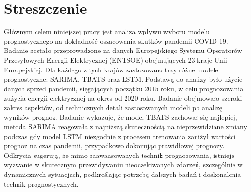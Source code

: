 \documentclass[polish, twoside, 12pt, a4paper]{article}
\theoremstyle{definition}
\theoremstyle{plain}
\theoremstyle{remark}
\begin{document}
\clearpage
%
%

\printbibliography[heading=subbibliography,nottype=online,title={Litaratura}]
\printbibliography[heading=subbibliography,type=online,title={Źródła online}]

\clearpage
{}
\listoftables

\clearpage
{}
\listoffigures

\clearpage
{}
\section*{Streszczenie}

Głównym celem niniejszej pracy jest analiza wpływu wyboru modelu prognostycznego na dokładność oszacowania skutków pandemii COVID-19. Badanie zostało przeprowadzone na danych Europejskiego Systemu Operatorów Przesyłowych Energii Elektrycznej (ENTSOE) obejmujących 23 kraje Unii Europejskiej. Dla każdego z tych krajów zastosowano trzy różne modele prognostyczne: SARIMA, TBATS oraz LSTM. Podstawą do analizy było użycie danych sprzed pandemii, sięgających początku 2015 roku, w celu prognozowania zużycia energii elektrycznej na okres od 2020 roku. Badanie obejmowało szeroki zakres aspektów, od technicznych detali zastosowanych modeli po analizę wyników prognoz. Badanie wykazuje, że model TBATS zachował się najlepiej, metoda SARIMA reagowała z najniższą skutecznością na nieprzewidziane zmiany podczas gdy model LSTM niezgodnie z procesem trenowania zaniżył wartości prognoz na czas pandemii, przypadkowo dokonując prawidłowej prognozy. Odkrycia sugerują, że mimo zaawansowanych technik prognozowania, istnieje wyzwanie w skutecznym przewidywaniu nieoczekiwanych zdarzeń, szczególnie w dynamicznych sytuacjach, podkreślając potrzebę dalszych badań i doskonalenia technik prognostycznych.
\end{document}
